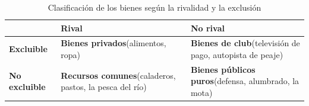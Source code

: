 \documentclass[11pt]{article}
\begin{document}
\begin{table}[H]
\centering
\caption{Clasificación de los bienes según la rivalidad y la exclusión}\label{tab:rivalidad-exclusion}
\begin{tabular}{>{\centering\arraybackslash}m{2.8cm}|>{\centering\arraybackslash}m{5.4cm}|>{\centering\arraybackslash}m{5.4cm}}
\rowcolor{tceeazulpalido} & \textbf{Rival} & \textbf{No rival} \\ \hline
\textbf{Excluible} & \textbf{Bienes privados}\newline (alimentos, ropa) & \textbf{Bienes de club}\newline (televisión de pago, autopista de peaje) \\ \hline
\textbf{No excluible} & \textbf{Recursos comunes}\newline (caladeros, pastos, la pesca del río) & \textbf{Bienes públicos puros}\newline (defensa, alumbrado, la mota) \\
\end{tabular}
\end{table}
\end{document}
